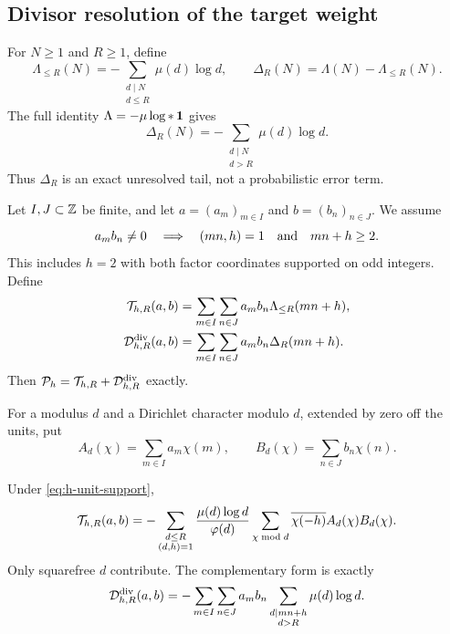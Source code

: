 \subsection{Divisor resolution of the target weight}

For $N\ge1$ and $R\ge1$, define
\begin{equation}\label{eq:truncated-lambda}
 \Lambda_{\le R}(N)
 =-\sum_{\substack{d\mid N\\d\le R}}\mu(d)\log d,
 \qquad
 \Delta_R(N)=\Lambda(N)-\Lambda_{\le R}(N).
\end{equation}
The full identity $\Lambda=-\mu\log *\,\mathbf 1$ gives
\begin{equation}\label{eq:exact-target-remainder}
 \Delta_R(N)
 =-\sum_{\substack{d\mid N\\d>R}}\mu(d)\log d.
\end{equation}
Thus $\Delta_R$ is an exact unresolved tail, not a probabilistic error term.

Let $I,J\subset\mathbb Z$ be finite, and let $a=(a_m)_{m\in I}$ and
$b=(b_n)_{n\in J}$.  We assume
\begin{equation}\label{eq:h-unit-support}
 a_mb_n\ne0\quad\Longrightarrow\quad (mn,h)=1
 \quad\hbox{and}\quad mn+h\ge2.
\end{equation}
This includes $h=2$ with both factor coordinates supported on odd integers.
Define
\begin{align}
 \mathcal T_{h,R}(a,b)
 &=\sum_{m\in I}\sum_{n\in J}a_mb_n\Lambda_{\le R}(mn+h),
 \label{eq:truncated-target-form}\\
 \mathcal D_{h,R}^{\mathrm{div}}(a,b)
 &=\sum_{m\in I}\sum_{n\in J}a_mb_n\Delta_R(mn+h).
 \label{eq:divisor-defect-form}
\end{align}
Then $\mathcal P_h=\mathcal T_{h,R}+\mathcal D_{h,R}^{\mathrm{div}}$ exactly.

For a modulus $d$ and a Dirichlet character modulo $d$, extended by zero off
the units, put
\begin{equation}\label{eq:resolution-transforms}
 A_d(\chi)=\sum_{m\in I}a_m\chi(m),
 \qquad
 B_d(\chi)=\sum_{n\in J}b_n\chi(n).
\end{equation}

\begin{theorem}\label{thm:target-resolution-expansion}
Under \eqref{eq:h-unit-support},
\begin{equation}\label{eq:target-resolution-expansion}
 \mathcal T_{h,R}(a,b)
 =-\sum_{\substack{d\le R\\(d,h)=1}}
 \frac{\mu(d)\log d}{\varphi(d)}
 \sum_{\chi\bmod d}
 \overline{\chi(-h)}A_d(\chi)B_d(\chi).
\end{equation}
Only squarefree $d$ contribute.  The complementary form is exactly
\begin{equation}\label{eq:target-resolution-defect}
 \mathcal D_{h,R}^{\mathrm{div}}(a,b)
 =-\sum_{m\in I}\sum_{n\in J}a_mb_n
   \sum_{\substack{d\mid mn+h\\d>R}}\mu(d)\log d.
\end{equation}
\end{theorem}

